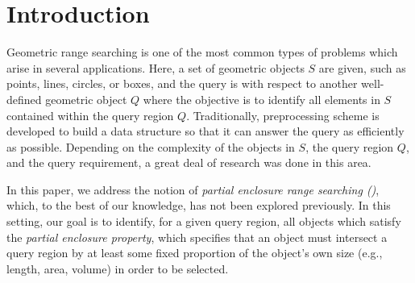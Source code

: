 \section{Introduction}
Geometric range searching is one of the most common types of 
problems which arise in several applications. Here, a set of 
geometric objects $S$ are given, such as points, lines, circles, 
or boxes, and the query is with respect to another well-defined 
geometric object $Q$ where the objective is to identify all 
elements in $S$ contained within the query region $Q$. 
Traditionally, preprocessing scheme is developed to build a data 
structure so that it can answer the query as efficiently as 
possible. Depending on the complexity of the objects in $S$, the 
query region $Q$, and the query requirement, a great deal of 
research was done in this area.  

In this paper, we address the notion of \emph{partial enclosure 
range searching (\PERS{})}, which, to the best of our knowledge, 
has not been explored previously. In this setting, our goal is 
to identify, for a given query region, all objects which satisfy 
the \emph{partial enclosure property}, which specifies that an 
object must intersect a query region by at least some fixed 
proportion of the object's own size (e.g., length, area, volume) 
in order to be selected.

